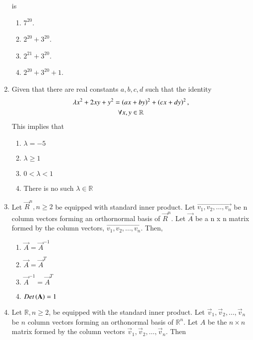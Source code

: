 \begin{enumerate}[label=\thesection.\arabic*.,ref=\thesection.\theenumi]
is
\begin{enumerate}
\item $7^{20}$.
\item $2^{20}+3^{20}$.
\item $2^{21}+3^{20}$.
\item $2^{20}+3^{20}+1$.
\end{enumerate}
%
\solution

\item Given that there are real constants $a,b,c,d$ such that the identity
\begin{multline}
\lambda x^2 + 2xy + y^2 = \left(ax+by\right)^2 + \left(cx+dy\right)^2, 
\\
 \forall x,y \in \mathbb{R}
\end{multline}
This implies that
\begin{enumerate}
\item $\lambda = -5$
\item $\lambda \ge 1$
\item $0 < \lambda < 1$
\item There is no such $\lambda \in \mathbb{R}$
\end{enumerate}
\solution

\item Let $\vec R^n, n\geq 2$ be equipped with standard inner product. Let $\vec {v_1, v_2,..., v_n}$ be n column vectors forming an orthornormal basis of $\vec R^n$. Let $\vec A$ be a n x n matrix formed by the column vectors, $\vec {v_1, v_2,..., v_n}$. Then, 
\begin{enumerate}
    \item $\vec A = \vec A^{-1}$
    \item $\vec A= \vec A^T$
    \item $\vec A^{-1}= \vec A^T $
    \item $Det\left(\mathbf A\right) = 1 $
\end{enumerate}
%
\solution

%
\item Let $\mathbb{R}, n \ge 2$, be equipped with the standard inner product.  Let
$\vec{v}_1,\vec{v}_2,\dots,\vec{v}_n$ be $n$ column vectors forming an orthonormal
basis of $\mathbb{R}^n$.  Let $A$ be the $n \times n$ matrix formed by the column vectors
$\vec{v}_1,\vec{v}_2,\dots,\vec{v}_n$.  Then 
\begin{enumerate}
\end{enumerate}
\end{enumerate}
